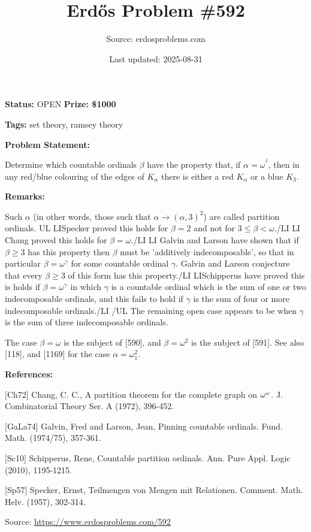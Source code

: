\documentclass{article}
\title{Erd\H{o}s Problem \#592}
\date{Last updated: 2025-08-31}
\author{Source: erdosproblems.com}
\begin{document}
\maketitle

\noindent\textbf{Status:} OPEN \quad \textbf{Prize: \$1000}

\noindent\textbf{Tags:} set theory, ramsey theory

\medskip
\noindent\textbf{Problem Statement:}

Determine which countable ordinals $\beta$ have the property that, if $\alpha=\omega^{^\beta}$, then in any red/blue colouring of the edges of $K_\alpha$ there is either a red $K_\alpha$ or a blue $K_3$.

\bigskip
\noindent\textbf{Remarks:}

Such $\alpha$ (in other words, those such that $\alpha \to (\alpha,3)^2$) are called partition ordinals.
{UL}
{LI}Specker \cite{Sp57} proved this holds for $\beta=2$ and not for $3\leq \beta <\omega$.{/LI}
{LI} Chang \cite{Ch72} proved this holds for $\beta=\omega$.{/LI}
{LI} Galvin and Larson \cite{GaLa74} have shown that if $\beta\geq 3$ has this property then $\beta$ must be 'additively indecomposable', so that in particular $\beta=\omega^\gamma$ for some countable ordinal $\gamma$. Galvin and Larson conjecture that every $\beta\geq 3$ of this form has this property.{/LI}
{LI}Schipperus \cite{Sc10} have proved this is holds if $\beta=\omega^\gamma$ in which $\gamma$ is a countable ordinal which is the sum of one or two indecomposable ordinals, and this fails to hold if $\gamma$ is the sum of four or more indecomposable ordinals.{/LI}
{/UL}
The remaining open case appears to be when $\gamma$ is the sum of three indecomposable ordinals.

The case $\beta=\omega$ is the subject of [590], and $\beta=\omega^2$ is the subject of [591]. See also [118], and [1169] for the case $\alpha=\omega_1^2$.

\bigskip
\noindent\textbf{References:}

[Ch72] Chang, C. C., A partition theorem for the complete graph on {$\omega\sp{\omega }$}. J. Combinatorial Theory Ser. A (1972), 396-452.
 
 [GaLa74] Galvin, Fred and Larson, Jean, Pinning countable ordinals. Fund. Math. (1974/75), 357-361.
 
 [Sc10] Schipperus, Rene, Countable partition ordinals. Ann. Pure Appl. Logic (2010), 1195-1215.
 
 [Sp57] Specker, Ernst, Teilmengen von Mengen mit Relationen. Comment. Math. Helv. (1957), 302-314.

\bigskip
\noindent\small{Source: \url{https://www.erdosproblems.com/592}}
\end{document}
